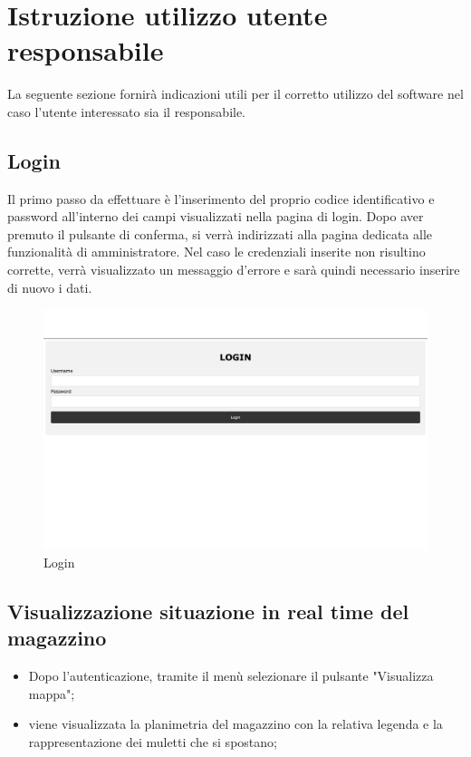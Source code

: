 \section{Istruzione utilizzo utente responsabile}

La seguente sezione fornirà indicazioni utili per il corretto utilizzo del software nel caso l'utente interessato sia il responsabile.

\subsection{Login}
Il primo passo da effettuare è l'inserimento del proprio codice identificativo e password all'interno dei campi visualizzati nella pagina di login. Dopo aver premuto il pulsante di conferma, si verrà indirizzati alla pagina dedicata alle funzionalità di amministratore. Nel caso le credenziali inserite non risultino corrette, verrà visualizzato un messaggio d'errore e sarà quindi necessario inserire di nuovo i dati.
\begin{figure}[H]
    \centering
    \includegraphics[scale=0.12]{res/images/login.png}
    \caption{Login}
\end{figure}

\subsection{Visualizzazione situazione in real time del magazzino}
\begin{itemize}
    \item Dopo l'autenticazione, tramite il menù selezionare il pulsante "Visualizza mappa";
    \item viene visualizzata la planimetria del magazzino con la relativa legenda e la rappresentazione dei muletti che si spostano;
    
\end{itemize}


